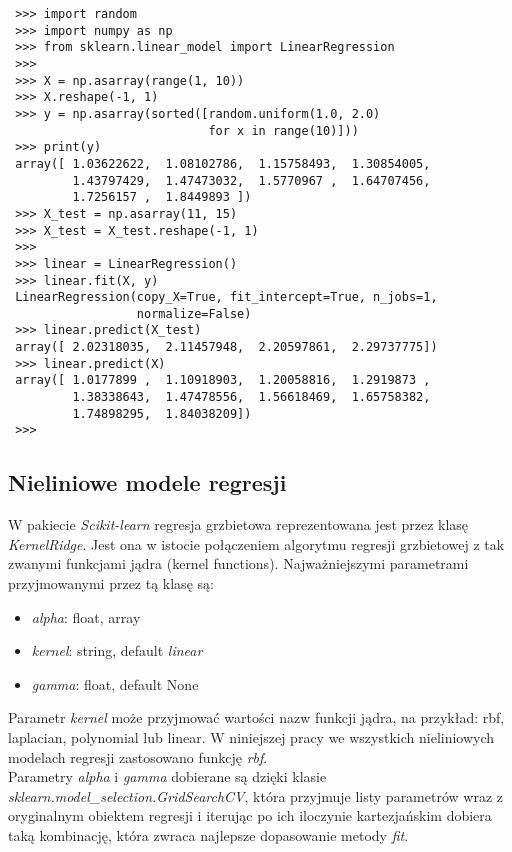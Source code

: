 \begin{lstlisting}
 >>> import random
 >>> import numpy as np
 >>> from sklearn.linear_model import LinearRegression
 >>>
 >>> X = np.asarray(range(1, 10))
 >>> X.reshape(-1, 1)
 >>> y = np.asarray(sorted([random.uniform(1.0, 2.0)
                            for x in range(10)]))
 >>> print(y)
 array([ 1.03622622,  1.08102786,  1.15758493,  1.30854005,
         1.43797429,  1.47473032,  1.5770967 ,  1.64707456,
         1.7256157 ,  1.8449893 ])
 >>> X_test = np.asarray(11, 15)
 >>> X_test = X_test.reshape(-1, 1)
 >>>
 >>> linear = LinearRegression()
 >>> linear.fit(X, y)
 LinearRegression(copy_X=True, fit_intercept=True, n_jobs=1,
                  normalize=False)
 >>> linear.predict(X_test)
 array([ 2.02318035,  2.11457948,  2.20597861,  2.29737775])
 >>> linear.predict(X)
 array([ 1.0177899 ,  1.10918903,  1.20058816,  1.2919873 ,
         1.38338643,  1.47478556,  1.56618469,  1.65758382,
         1.74898295,  1.84038209])
 >>>
\end{lstlisting}


\subsection{Nieliniowe modele regresji}
W pakiecie \textit{Scikit-learn} regresja grzbietowa reprezentowana jest przez klasę \textit{KernelRidge}.
Jest ona w istocie połączeniem algorytmu regresji grzbietowej z tak zwanymi funkcjami jądra (kernel functions).
Najważniejszymi parametrami przyjmowanymi przez tą klasę są:
\begin{itemize}
 \item \textit{alpha}: {float, array}
 \item \textit{kernel}: string, default \textit{linear}
 \item \textit{gamma}: float, default None\\
\end{itemize}

Parametr \textit{kernel} może przyjmować wartości nazw funkcji jądra, na przykład: rbf, laplacian, polynomial lub linear. W niniejszej pracy we wszystkich nieliniowych modelach regresji zastosowano funkcję \textit{rbf}.\\

Parametry \textit{alpha} i \textit{gamma} dobierane są dzięki klasie \textit{sklearn.model\_selection.GridSearchCV}, 
która przyjmuje listy parametrów wraz z oryginalnym obiektem regresji i iterując po ich iloczynie kartezjańskim dobiera taką kombinację, która zwraca najlepsze dopasowanie metody \textit{fit{}}.

